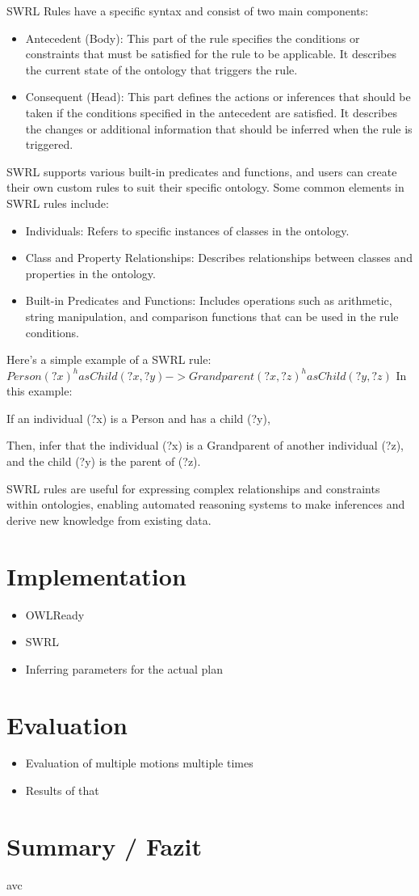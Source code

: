 \documentclass[	pdftex, 
								a4paper,
								11pt, DIV11, BCOR5mm,
								parskip,
								]{scrreprt}
\begin{document}
	SWRL Rules have a specific syntax and consist of two main components:
	\begin{itemize}
		\item Antecedent (Body): This part of the rule specifies the conditions or constraints that must be satisfied for the rule to be applicable. It describes the current state of the ontology that triggers the rule.
		\item Consequent (Head): This part defines the actions or inferences that should be taken if the conditions specified in the antecedent are satisfied. It describes the changes or additional information that should be inferred when the rule is triggered.
	\end{itemize}
	SWRL supports various built-in predicates and functions, and users can create their own custom rules to suit their specific ontology. Some common elements in SWRL rules include:
	\begin{itemize}
		\item Individuals: Refers to specific instances of classes in the ontology.
		\item Class and Property Relationships: Describes relationships between classes and properties in the ontology.
		\item Built-in Predicates and Functions: Includes operations such as arithmetic, string manipulation, and comparison functions that can be used in the rule conditions.
	\end{itemize}
	Here's a simple example of a SWRL rule:
	\newline
	$Person(?x) ^ hasChild(?x, ?y) -> Grandparent(?x, ?z) ^ hasChild(?y, ?z)$
	\newline
	In this example:

	If an individual (?x) is a Person and has a child (?y),
	
	Then, infer that the individual (?x) is a Grandparent of another individual (?z), and the child (?y) is the parent of (?z).
	
	SWRL rules are useful for expressing complex relationships and constraints within ontologies, enabling automated reasoning systems to make inferences and derive new knowledge from existing data.







	\chapter*{Implementation}
	\begin{itemize}
		\item OWLReady
		\item SWRL
		\item Inferring parameters for the actual plan
	\end{itemize}
	
	\chapter*{Evaluation}
	\begin{itemize}
		\item Evaluation of multiple motions multiple times
		\item Results of that
	\end{itemize}
	\chapter*{Summary / Fazit}
avc
\end{document}
